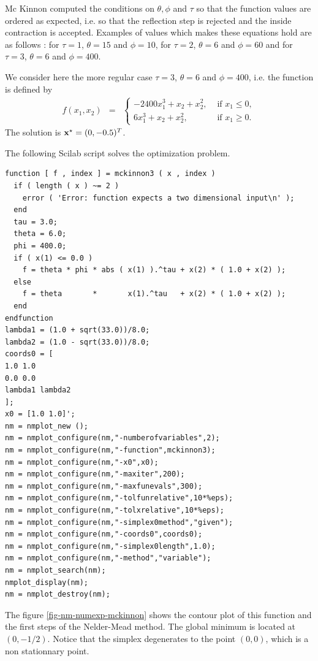Mc Kinnon computed the conditions on $\theta,\phi$ and $\tau$
so that the function values are ordered as expected, i.e. so that the 
reflection step is rejected and the inside contraction is accepted.
Examples of values which makes these equations hold are as follows :
for $\tau=1$, $\theta=15$ and $\phi = 10$, 
for $\tau=2$, $\theta=6$ and $\phi = 60$ and
for $\tau=3$, $\theta=6$ and $\phi = 400$.

We consider here the more regular case $\tau=3$, $\theta=6$
and $\phi = 400$, i.e. the function is defined by 
\begin{eqnarray}
\label{mckinnon-function3}
f(x_1,x_2) &=& 
\left\{
\begin{array}{ll}
- 2400 x_1^3 + x_2 + x_2^2, & \textrm{ if } x_1\leq 0, \\
6 x_1^3 + x_2 + x_2^2, & \textrm{ if } x_1\geq 0.
\end{array}
\right.
\end{eqnarray}
The solution is $\mathbf{x}^\star = (0 , -0.5 )^T$.

The following Scilab script solves the optimization problem.

\lstset{language=scilabscript}
\begin{lstlisting}
function [ f , index ] = mckinnon3 ( x , index )
  if ( length ( x ) ~= 2 )
    error ( 'Error: function expects a two dimensional input\n' );
  end
  tau = 3.0;
  theta = 6.0;
  phi = 400.0;
  if ( x(1) <= 0.0 )
    f = theta * phi * abs ( x(1) ).^tau + x(2) * ( 1.0 + x(2) );
  else
    f = theta       *       x(1).^tau   + x(2) * ( 1.0 + x(2) );
  end
endfunction
lambda1 = (1.0 + sqrt(33.0))/8.0;
lambda2 = (1.0 - sqrt(33.0))/8.0;
coords0 = [
1.0 1.0
0.0 0.0
lambda1 lambda2
];
x0 = [1.0 1.0]';
nm = nmplot_new ();
nm = nmplot_configure(nm,"-numberofvariables",2);
nm = nmplot_configure(nm,"-function",mckinnon3);
nm = nmplot_configure(nm,"-x0",x0);
nm = nmplot_configure(nm,"-maxiter",200);
nm = nmplot_configure(nm,"-maxfunevals",300);
nm = nmplot_configure(nm,"-tolfunrelative",10*%eps);
nm = nmplot_configure(nm,"-tolxrelative",10*%eps);
nm = nmplot_configure(nm,"-simplex0method","given");
nm = nmplot_configure(nm,"-coords0",coords0);
nm = nmplot_configure(nm,"-simplex0length",1.0);
nm = nmplot_configure(nm,"-method","variable");
nm = nmplot_search(nm);
nmplot_display(nm);
nm = nmplot_destroy(nm);
\end{lstlisting}


The figure \ref{fig-nm-numexp-mckinnon} shows the contour plot of this function and the first 
steps of the Nelder-Mead method.
The global minimum is located at $(0,-1/2)$.
Notice that the simplex degenerates to the
point $(0,0)$, which is a non stationnary point.

